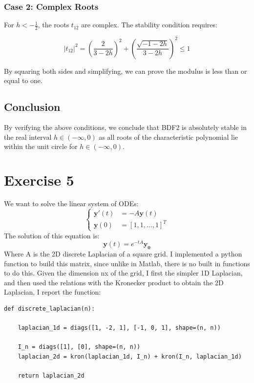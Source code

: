 \documentclass[a4paper,12pt]{article}
\begin{document}
\subsubsection*{Case 2: Complex Roots}

For \( h < -\frac{1}{2} \), the roots \( t_{12} \) are complex. The stability condition requires:

\[
|t_{12}|^2 = \left( \frac{2}{3 - 2h} \right)^2 + \left( \frac{\sqrt{-1 - 2h}}{3 - 2h} \right)^2 \leq 1
\]

By squaring both sides and simplifying, we can prove the modulus is less than or equal to one.

\subsection*{Conclusion}

By verifying the above conditions, we conclude that BDF2 is absolutely stable in the real interval \( h \in (-\infty, 0) \) as all roots of the characteristic polynomial lie within the unit circle for \( h \in (-\infty, 0) \).


\section{Exercise 5}
 We want to solve the linear system of ODEs:
 \begin{equation}
\begin{cases}
\mathbf{y}'(t) &= -A\mathbf{y}(t) \\
\mathbf{y}(0) &= [1,1,...,1]^T
\end{cases}
\end{equation}
The solution of this equation is:
 \begin{equation}
\mathbf{y}(t) = e^{-tA}\mathbf{y_0}
\end{equation}
Where A is the 2D discrete Laplacian of a square grid. 
I implemented a python function to build this matrix, since unlike in Matlab, there is no built in functions to do this.
Given the dimension nx of the grid, I first the simpler 1D Laplacian, and then used the relations with the Kronecker product to obtain the 2D Laplacian, I report the function:

\begin{verbatim}
def discrete_laplacian(n):

    laplacian_1d = diags([1, -2, 1], [-1, 0, 1], shape=(n, n))

    I_n = diags([1], [0], shape=(n, n))
    laplacian_2d = kron(laplacian_1d, I_n) + kron(I_n, laplacian_1d)

    return laplacian_2d
\end{verbatim}
\end{document}
